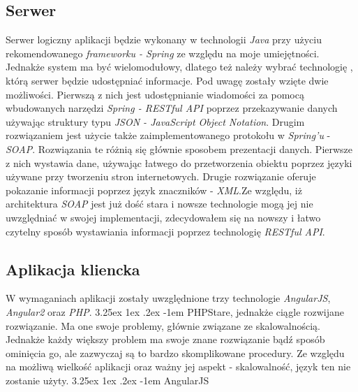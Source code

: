 \documentclass[10pt,titlepage]{article} %
\makeatletter
\renewcommand{\normalsize}{\fontsize{8pt}{10pt}\selectfont} %
\renewcommand\paragraph{\@startsection{paragraph}{5}{\z@}%
  {3.25ex \@plus1ex \@minus.2ex}%
  {-1em}%
  {\normalfont\normalsize\bfseries}}
\makeatother
\begin{document}
\subsection{Serwer}
Serwer logiczny aplikacji będzie wykonany w technologii \textit{Java} przy użyciu rekomendowanego \textit{frameworku - Spring} ze względu na moje umiejętności. Jednakże system ma być wielomodułowy, dlatego też należy wybrać technologię , którą serwer będzie udostępniać informacje. Pod uwagę zostały wzięte dwie możliwości. Pierwszą z nich jest udostępnianie wiadomości za pomocą wbudowanych narzędzi \textit{Spring - RESTful API} poprzez przekazywanie danych używając struktury typu \textit{JSON - JavaScript Object Notation}. Drugim rozwiązaniem jest użycie także zaimplementowanego protokołu w \textit{Spring'u} - \textit{SOAP}. \mbox\\

Rozwiązania te różnią się głównie sposobem prezentacji danych. Pierwsze z nich wystawia dane, używając łatwego do przetworzenia obiektu poprzez języki używane przy tworzeniu stron internetowych. Drugie rozwiązanie oferuje pokazanie informacji poprzez język znaczników - \textit{XML}.\mbox\\
Ze względu, iż architektura \textit{SOAP} jest już dość stara i nowsze technologie mogą jej nie uwzględniać w swojej implementacji, zdecydowałem się na nowszy i łatwo czytelny sposób wystawiania informacji poprzez technologię \textit{RESTful API}.
\subsection{Aplikacja kliencka}
W wymaganiach aplikacji zostały uwzględnione trzy technologie \textit{AngularJS}, \textit{Angular2} oraz \textit{PHP}.
\paragraph{PHP}\mbox\\ 

Stare, jednakże ciągle rozwijane rozwiązanie. Ma one swoje problemy, głównie związane ze skalowalnością. Jednakże każdy większy problem ma swoje znane rozwiązanie bądź sposób ominięcia go, ale zazwyczaj są to bardzo skomplikowane procedury. Ze względu na możliwą wielkość aplikacji oraz ważny jej aspekt - skalowalność, język ten nie zostanie użyty.
\paragraph{AngularJS}\mbox\\
\end{document}
